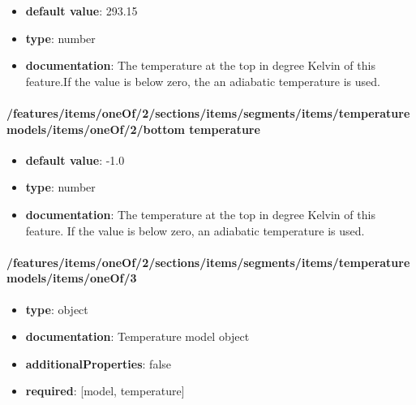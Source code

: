 \begin{itemize}\item {\bf default value}: 293.15
\item {\bf type}: number
\item {\bf documentation}: The temperature at the top in degree Kelvin of this feature.If the value is below zero, the an adiabatic temperature is used.
\end{itemize}\paragraph{/features/items/oneOf/2/sections/items/segments/items/temperature models/items/oneOf/2/bottom temperature}
\begin{itemize}\item {\bf default value}: -1.0
\item {\bf type}: number
\item {\bf documentation}: The temperature at the top in degree Kelvin of this feature. If the value is below zero, an adiabatic temperature is used.
\end{itemize}\paragraph{/features/items/oneOf/2/sections/items/segments/items/temperature models/items/oneOf/3}
\begin{itemize}\item {\bf type}: object
\item {\bf documentation}: Temperature model object
\item {\bf additionalProperties}: false
\item {\bf required}: [model, temperature]\end{itemize}

